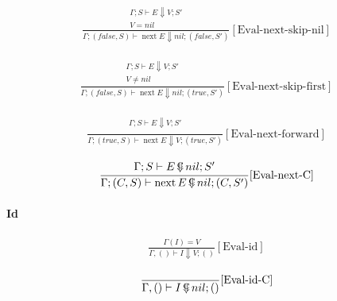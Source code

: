 \documentclass{scrartcl}
\DeclareMathOperator{\nextop}{next}
\DeclareMathOperator{\ceval}{\overset{C}{\smash{\Downarrow}}}
\begin{document}
    \begin{align*}
    \frac{
        \begin{matrix}
        \Gamma; S \vdash E \Downarrow V; S' \\
        V = nil
        \end{matrix}
    }{
        \Gamma; (false, S) \vdash \nextop E \Downarrow nil; (false, S')
    }[\text{Eval-next-skip-nil}]
    \end{align*}
    
    \begin{align*}
    \frac{
        \begin{matrix}
        \Gamma; S \vdash E \Downarrow V; S' \\
        V \neq nil
        \end{matrix}
    }{
        \Gamma; (false, S) \vdash \nextop E \Downarrow nil; (true, S')
    }[\text{Eval-next-skip-first}]
    \end{align*}
    
    \begin{align*}
    \frac{
        \begin{matrix}
        \Gamma; S \vdash E \Downarrow V; S' \\
        \end{matrix}
    }{
        \Gamma; (true, S) \vdash \nextop E \Downarrow V; (true, S')
    }[\text{Eval-next-forward}]
    \end{align*}
    
    \begin{align*}
    \frac{
        \begin{matrix}
        \Gamma; S \vdash E \ceval nil; S' \\
        \end{matrix}
    }{
        \Gamma; (C, S) \vdash \nextop E \ceval nil; (C, S')
    }[\text{Eval-next-C}]
    \end{align*}
    
    \paragraph{Id}
    
    \begin{align*}
    \frac{
        \Gamma(I) = V
    }{
        \Gamma, () \vdash I \Downarrow V; ()
    }[\text{Eval-id}]
    \end{align*}
    
    \begin{align*}
    \frac{}{
        \Gamma, () \vdash I \ceval nil; ()
    }[\text{Eval-id-C}]
    \end{align*}
    
\end{document}
